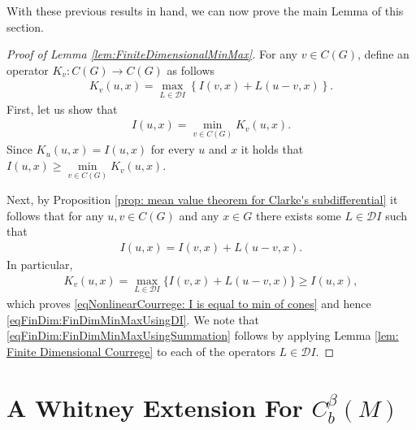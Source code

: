\documentclass[11pt,reqno]{amsart}
\numberwithin{equation}{section}
\theoremstyle{plain}
\begin{document}
With these previous results in hand, we can now prove the main Lemma of this section.

\begin{proof}[Proof of Lemma \ref{lem:FiniteDimensionalMinMax}]
  For any $v\in C(G)$, define an operator $K_v:C(G)\to C(G)$ as follows
  \begin{align*}
    K_v(u,x) = \max \limits_{L \in \mathcal{D}I } \left \{ I(v,x)+L(u-v,x) \right \}.  
  \end{align*}	  
  First, let us show that
  \begin{align}
    I(u,x) = \min\limits_{v \in C(G)} K_v(u,x).\label{eqNonlinearCourrege: I is equal to min of cones}	  
  \end{align}	  
  Since $K_u(u,x)=I(u,x)$ for every $u$ and $x$ it holds that $ I(u,x) \geq \min\limits_{v \in C(G)} K_v(u,x)$.
  
  Next, by Proposition \ref{prop: mean value theorem for Clarke's subdifferential} it follows that for any $u,v \in C(G)$ and any $x \in G$ there exists some $L\in \mathcal{D}I$ such that
  \begin{align*}
    I(u,x) = I(v,x) + L(u-v,x).
  \end{align*}
  In particular,
  \begin{align*}
    K_v(u,x)= \max\limits_{L \in \mathcal{D}I} \{ I(v,x)+L(u-v,x)\} \geq I(u,x),	  
  \end{align*}	  
  which proves \eqref{eqNonlinearCourrege: I is equal to min of cones} and hence \eqref{eqFinDim:FinDimMinMaxUsingDI}. We note that \eqref{eqFinDim:FinDimMinMaxUsingSummation} follows by applying Lemma \ref{lem: Finite Dimensional Courrege} to each of the operators $L\in\mathcal{D}I$. 
  
\end{proof}




\section{A Whitney Extension For $C^\beta_b(M)$}\label{sec: finite dimensional approximations}
\end{document}
